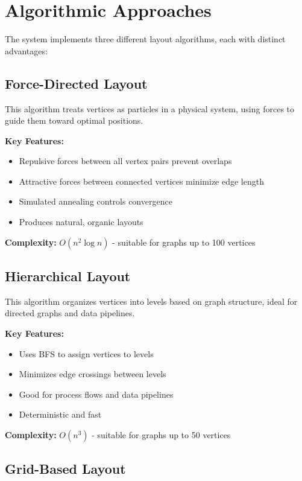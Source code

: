 \documentclass[11pt]{article}
\begin{document}
\section{Algorithmic Approaches}

The system implements three different layout algorithms, each with distinct advantages:

\subsection{Force-Directed Layout}

This algorithm treats vertices as particles in a physical system, using forces to guide them toward optimal positions.

\textbf{Key Features:}
\begin{itemize}
\item Repulsive forces between all vertex pairs prevent overlaps
\item Attractive forces between connected vertices minimize edge length
\item Simulated annealing controls convergence
\item Produces natural, organic layouts
\end{itemize}

\textbf{Complexity:} $O(n^2 \log n)$ - suitable for graphs up to 100 vertices

\subsection{Hierarchical Layout}

This algorithm organizes vertices into levels based on graph structure, ideal for directed graphs and data pipelines.

\textbf{Key Features:}
\begin{itemize}
\item Uses BFS to assign vertices to levels
\item Minimizes edge crossings between levels
\item Good for process flows and data pipelines
\item Deterministic and fast
\end{itemize}

\textbf{Complexity:} $O(n^3)$ - suitable for graphs up to 50 vertices

\subsection{Grid-Based Layout}
\end{document}
